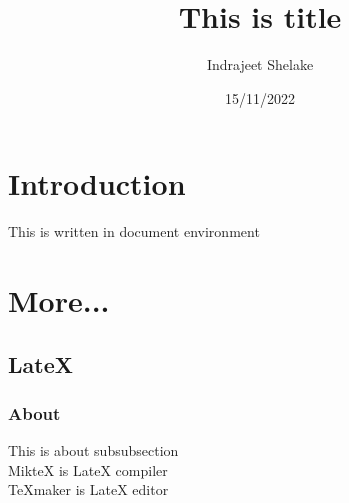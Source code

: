 \documentclass[12pt]{article}
\title{This is title}
\date{15/11/2022}
\author{Indrajeet Shelake}
\begin{document}
\maketitle
{}

\newpage
\section{Introduction}
This is written in document environment

\section{More...}
\subsection{LateX}
\subsubsection{About}
This is about subsubsection \\
MikteX is LateX compiler \\
TeXmaker is LateX editor \\
\end{document}
